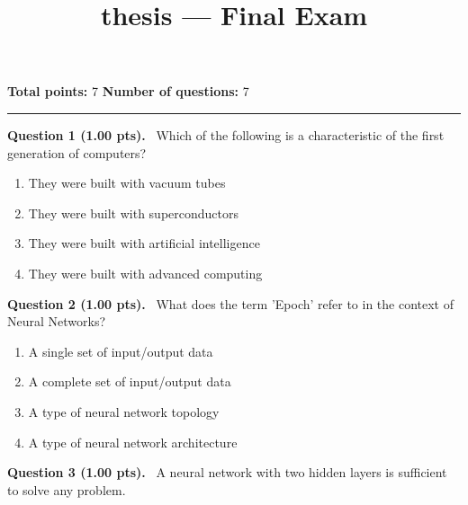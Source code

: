 \documentclass[12pt,a4paper]{article}
\title{thesis — Final Exam}
\date{}
\begin{document}
\maketitle



\noindent
\textbf{Total points:} 7
\hfill
\textbf{Number of questions:} 7

\vspace{1em}
\hrule
\vspace{1.5em}


\noindent
\textbf{Question 1 (1.00 pts).}~
Which of the following is a characteristic of the first generation of computers?


\begin{enumerate}[label=\textbf{\Alph*.}]

  \item They were built with vacuum tubes

  \item They were built with superconductors

  \item They were built with artificial intelligence

  \item They were built with advanced computing

\end{enumerate}



\vspace{0.5em}


\noindent
\textbf{Question 2 (1.00 pts).}~
What does the term 'Epoch' refer to in the context of Neural Networks?


\begin{enumerate}[label=\textbf{\Alph*.}]

  \item A single set of input/output data

  \item A complete set of input/output data

  \item A type of neural network topology

  \item A type of neural network architecture

\end{enumerate}



\vspace{0.5em}


\noindent
\textbf{Question 3 (1.00 pts).}~
A neural network with two hidden layers is sufficient to solve any problem.
\end{document}
